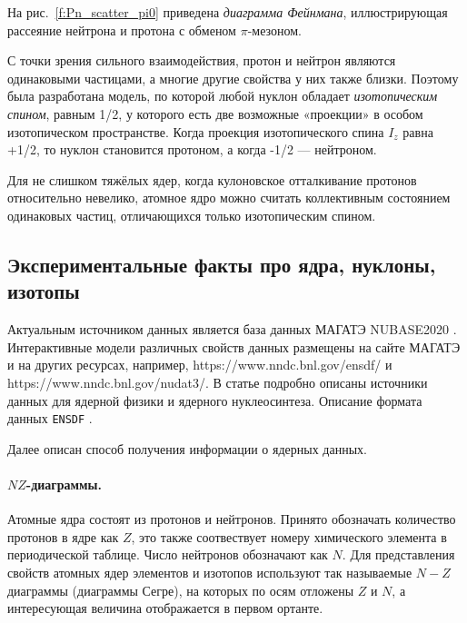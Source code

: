 \documentclass[a5paper,openany]{book}
\begin{document}
	На рис.~\ref{f:Pn_scatter_pi0} приведена  \emph{диаграмма Фейнмана}, иллюстрирующая рассеяние нейтрона и протона с обменом $\pi$-мезоном. 
	
	С точки зрения сильного взаимодействия, протон и нейтрон являются одинаковыми частицами, а многие другие свойства у них также близки. Поэтому была разработана модель, по которой любой нуклон обладает  \emph{изотопическим спином}, равным 1/2, у которого есть две возможные «проекции» в особом изотопическом пространстве. Когда проекция изотопического спина $I_z$ равна +1/2, то нуклон становится протоном, а когда -1/2 --- нейтроном.
	
	Для не слишком тяжёлых ядер, когда кулоновское отталкивание протонов относительно невелико, атомное ядро можно считать коллективным состоянием одинаковых частиц, отличающихся только изотопическим спином.
	
	\subsection{Экспериментальные факты про ядра, нуклоны, изотопы} \label{ExpNuclData}
	
	Актуальным источником данных является база данных МАГАТЭ NUBASE2020 \cite{NUBASE2020}.
	Интерактивные модели различных свойств данных размещены на сайте МАГАТЭ  \cite{IAEA} и на других ресурсах, например,  https://www.nndc.bnl.gov/ensdf/ и https://www.nndc.bnl.gov/nudat3/.	
	В статье \cite{Smith2023} подробно описаны источники данных для ядерной физики и ядерного нуклеосинтеза. 
 Описание формата данных {\tt ENSDF} \cite{ENSDF}. %
	
	Далее описан способ получения информации о ядерных данных.	
	
	\paragraph{$NZ$-диаграммы.} Атомные ядра состоят из протонов и нейтронов. Принято обозначать количество протонов в ядре как $Z$, это также соотвествует номеру химического элемента в периодической таблице. Число нейтронов обозначают как $N$. Для представления свойств атомных ядер элементов и изотопов используют так называемые $N-Z$ диаграммы (диаграммы Сегре), на которых по осям  отложены $Z$ и $N$, а интересующая величина отображается в первом ортанте. 
	
\end{document}
